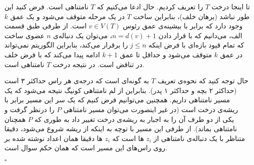 \documentclass[a4paper,12pt]{article}
\begin{document}
تا اینجا درخت $T$ را تعریف کردیم. حال ادعا می‌کنیم که $T$ نامتناهی است. فرض کنید این طور نباشد (برهان خلف)، بنابراین ساخت $T$ در یک مرحله متوقف می‌شود و یک عمق $k$ وجود دارد که برابر با بیشینه‌ی عمق رئوس $v \in V(T)$ است. از طرفی طبق قسمت الف، می‌دانیم که با قرار دادن $n= d(v)+1$، می‌توان یک دنباله‌ی $n$ عضوی ساخت که تمام قیود بازه‌ای با فرض اینکه $j \leq n$ را برقرار می‌کند، بنابراین الگوریتم نمی‌تواند در عمق $k$ متوقف می‌شود و حداقل تا عمق $k+1$ ادامه پیدا می‌کند که با فرض خلف در تناقض است. در نتیجه درخت $T$ نامتناهی است.

حال توجه کنید که نحوه‌ی تعریف $T$ به گونه‌ای است که درجه‌ی هر راس حداکثر ۳ است (حداکثر ۲ بچه و حداکثر ۱ پدر). بنابراین از لم نامتناهی  کونیگ نتیجه می‌شود که یک مسیر نامتناهی داریم. همچنین می‌توانیم فرض کنیم که یک سر این مسیر برابر با ریشه‌ی درخت است (در غیر اینصورت می‌توان مسیر نامتناهی $P$ را درنظر گرفت و یکی از دو طرف آن را به اجبار به ریشه‌ی درخت تغییر داد به طوری که $P$ همچنان نامتناهی بماند). از طرفی این مسیر با توچه به اینکه از ریشه شروع می‌شود، دقیقا متناظر با یک دنباله‌ی نامتناهی از $z_i$ ها است که $z_i$ ها دقیقا همان اعداد نوشته‌ شده بر روی راس‌های این مسیر است که همان حکم سوال است.
\begin{latin}
	$\square$
\end{latin}
\end{document}

